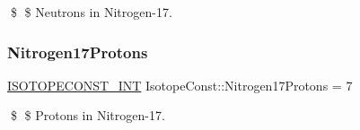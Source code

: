 \$ \$ Neutrons in Nitrogen-\/17. \mbox{\label{group___isotope_const-_nitrogen-_n17_gad322aa8866af4fa5014d4167db260174}} 
\subsubsection{\texorpdfstring{Nitrogen17\+Protons}{Nitrogen17Protons}}
{\footnotesize\ttfamily \mbox{\hyperlink{group___isotope_const-_macros_ga5f18360b3e99483a35c32d789e62621c}{I\+S\+O\+T\+O\+P\+E\+C\+O\+N\+S\+T\+\_\+\+I\+NT}} Isotope\+Const\+::\+Nitrogen17\+Protons = 7}

\$ \$ Protons in Nitrogen-\/17. 